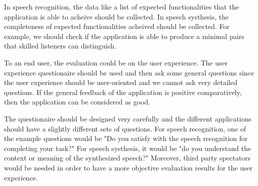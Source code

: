 \documentclass[12pt]{article}
\newenvironment{problem}[2][Problem]{\begin{trivlist}
\item[\hskip \labelsep {\bfseries #1}\hskip \labelsep {\bfseries #2.}]}{\end{trivlist}}
\begin{document}
\begin{problem}{5.2}
    In speech recognition, the data like a list of expected functionalities that 
    the application is able to acheive should be collected. In speech systhesis,
    the completeness of expected functionalities acheived
    should be collected. For example, we should check if the application is able
    to produce a minimal pairs that skilled listeners can distinguish.

    To an end user, the evaluation could be on the user experience. 
    The user experience questionaire should be used and then ask some general
    questions since the user experience should be user-oriented and we cannot
    ask very detailed questions. If the general feedback of the application is 
    positive comparatively, then the application can be considered as good.

    The questionaire should be designed very carefully and the different applications
    should have a slightly different sets of questions. 
    For speech recognition, one of the example questions would be "Do you satisfy
    with the speech recognition for completing your task?"
    For speech systhesis, it would be "do you understand the context or meaning
    of the synthesized speech?" 
    Moreover, third party spectators would be needed in order to have a more objective
    evaluation results for the user experience.
\end{problem}
\end{document}
